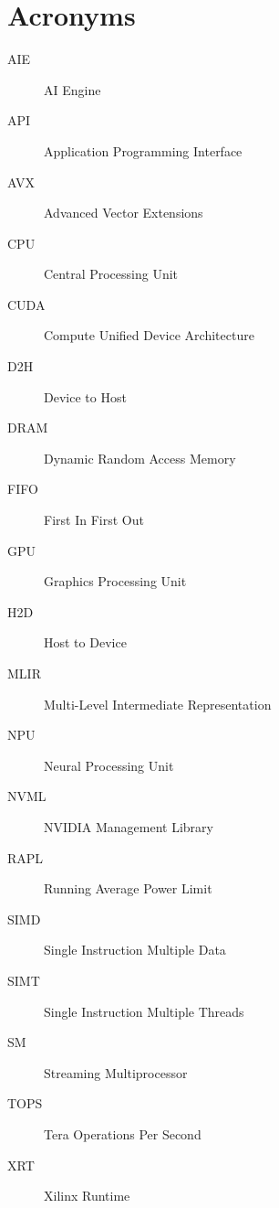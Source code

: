 \chapter{Acronyms}
\label{app:acronyms}

\begin{description}
    \item[{AIE}] {AI Engine}
    \item[{API}] {Application Programming Interface}
    \item[{AVX}] {Advanced Vector Extensions}
    \item[{CPU}] {Central Processing Unit}
    \item[{CUDA}] {Compute Unified Device Architecture}
    \item[{D2H}] {Device to Host}
    \item[{DRAM}] {Dynamic Random Access Memory}
    \item[{FIFO}] {First In First Out}
    \item[{GPU}] {Graphics Processing Unit}
    \item[{H2D}] {Host to Device}
    \item[{MLIR}] {Multi-Level Intermediate Representation}
    \item[{NPU}] {Neural Processing Unit}
    \item[{NVML}] {NVIDIA Management Library}
    \item[{RAPL}] {Running Average Power Limit}
    \item[{SIMD}] {Single Instruction Multiple Data}
    \item[{SIMT}] {Single Instruction Multiple Threads}
    \item[{SM}] {Streaming Multiprocessor}
    \item[{TOPS}] {Tera Operations Per Second}
    \item[{XRT}] {Xilinx Runtime}
\end{description}
